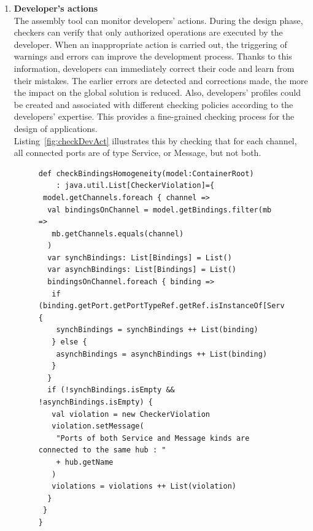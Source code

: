 \vspace{0.75cm}
\begin{enumerate}
\item {\bf Developer's actions}\\
The assembly tool can monitor developers' actions. During the design phase, checkers can verify that only authorized operations are executed by the developer. When an inappropriate action is carried out, the triggering of warnings and errors can improve the development process. Thanks to this information, developers can immediately correct their code and learn from their mistakes. The earlier errors are detected and corrections made, the more the impact on the global solution is reduced. Also, developers' profiles could be created and associated with different checking policies according to the developers' expertise. This provides a fine-grained checking process for the design of applications.\\
Listing~\ref{fig:checkDevAct} illustrates this by checking that for each channel, all connected ports are of type Service, or Message, but not both.

\begin{figure}[h!]
\centering
\begin{lstlisting}[caption=Example checking developpers' actions,label=fig:checkDevAct,basicstyle=\scriptsize\ttfamily,tabsize=1 ]
def checkBindingsHomogeneity(model:ContainerRoot)
	: java.util.List[CheckerViolation]={
 model.getChannels.foreach { channel =>
  val bindingsOnChannel = model.getBindings.filter(mb =>
   mb.getChannels.equals(channel)
  )
  var synchBindings: List[Bindings] = List()
  var asynchBindings: List[Bindings] = List()
  bindingsOnChannel.foreach { binding =>
   if (binding.getPort.getPortTypeRef.getRef.isInstanceOf[ServicePortType]) {
    synchBindings = synchBindings ++ List(binding)
   } else {
    asynchBindings = asynchBindings ++ List(binding)
   }
  }
  if (!synchBindings.isEmpty && !asynchBindings.isEmpty) {
   val violation = new CheckerViolation
   violation.setMessage(
    "Ports of both Service and Message kinds are connected to the same hub : "
    + hub.getName
   )
   violations = violations ++ List(violation)
  }
 }
}
\end{lstlisting}
\vspace{-0,4cm}
\end{figure}

\vspace{0.50cm}


\end{enumerate}
